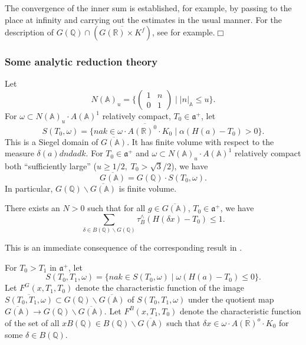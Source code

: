 The convergence of the inner sum is established, for example, by passing to
the place at infinity and carrying out the estimates in the usual manner.
For the description of
$G({\mathbb{Q}})\cap (\overline{G({\mathbb{R}})\times K^f})$,
see \cite{K2} for example.$\Box $

\subsubsection{Some analytic reduction theory}

Let 
\[
N({\mathbb{A}})_u=\{\left( 
\begin{array}{cc}
1 & n \\ 
0 & 1
\end{array}
\right) \;|\;|n|_{{\mathbb{A}}}\leq u\}. 
\]
For $\omega \subset N({\mathbb{A}})_u\cdot A({\mathbb{A}})^1$
relatively compact, $T_0\in {\mathfrak{a}}^{+}$, let 
\[
S(T_0,\omega )=
\{nak\in \overline{\omega \cdot A({\mathbb{R}})^0\cdot K_0}
\;|\;\alpha (H(a)-T_0)>0\}. 
\]
This is a Siegel domain of $\overline{G({\mathbb{A}})}$. It has finite volume
with respect to the measure $\delta (a)dndadk$. For $T_0\in {\mathfrak{a}}^{+}$
and $\omega \subset N({\mathbb{A}})_u\cdot A({\mathbb{A}})^1$ relatively
compact both
``sufficiently large'' ($u\geq 1/2,\;T_0>\sqrt{3}/2$), we have 
\[
\overline{G({\mathbb{A}})}=G({\mathbb{Q}})\cdot S(T_0,\omega ). 
\]
In particular, $G({\mathbb{Q}})\backslash \overline{G({\mathbb{A}})}$ is
finite volume.

\begin{lemma}\label{lem:4.2}
There exists an $N>0$ such that for all $g\in \overline{G({\mathbb{A}})}$,
$T_0\in {\mathfrak{a}}^{+}$, we have 
\[
\sum_{\delta \in B({\mathbb{Q}})\backslash G({\mathbb{Q}})}
\tau _B^{\wedge }(H(\delta x)-T_0)\leq 1.
\]
\end{lemma}

This is an immediate consequence of the corresponding result in \cite{A2}.

For $T_0>T_1$ in ${\mathfrak{a}}^{+}$, let 
\[
S(T_0,T_1,\omega )=\{nak\in S(T_0,\omega )\;|\;\omega (H(a)-T_0)\leq 0\}. 
\]
Let $F^G(x,T_1,T_0)$ denote the characteristic function of the image
$\overline{S(T_0,T_1,\omega )}\subset
G({\mathbb{Q}})\backslash \overline{G({\mathbb{A}})}$ of
$S(T_0,T_1,\omega )$ under the quotient map
$\overline{G({\mathbb{A}})}\rightarrow
G({\mathbb{Q}})\backslash \overline{G({\mathbb{A}})}$. Let
$F^B(x,T_1,T_0)$
denote the characteristic function of the set of all
$xB({\mathbb{Q}})\in B({\mathbb{Q}})\backslash \overline{G({\mathbb{A}})}$ such
that $\delta x\in \overline{\omega \cdot A({\mathbb{R}})^o\cdot K_0}$
for some $\delta \in B({\mathbb{Q}})$.

